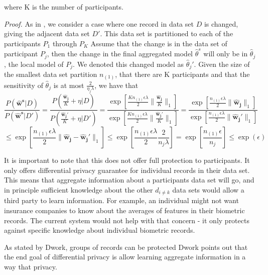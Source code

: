 where K is the number of participants.

\textit{Proof.} As in \cite{pathak2010diffprivhomo}, we consider a case where one record in data set $D$ is changed, giving the adjacent data set $D'$. This data set is partitioned to each of the participants $P_1$ through $P_K$ Assume that the change is in the data set of participant $P_j$, then the change in the final aggregated model $\hat{\theta}^s$ will only be in $\hat{\theta}_j$, the local model of $P_j$. We denoted this changed model as $\hat{\theta}_j'$. Given the size of the smallest data set partition $n_{(1)}$, that there are K participants and that the sensitivity of $\hat{\theta}_j$ is at most $\frac{2}{\eta_j\lambda}$, we have that
$$
\frac{P(\boldsymbol{\hat{w}^s}|D)}{P(\boldsymbol{\hat{w}^s}|D')} = \frac{P(\frac{\boldsymbol{\hat{w}_j}}{K} + \eta|D)}{P(\frac{\boldsymbol{\hat{w}_j'}}{K} + \eta|D')} = \frac{\exp[\frac{K n_{(1)}\epsilon\lambda}{2}\|\frac{\boldsymbol{\hat{w}_j}}{K}\|_1]}{\exp[\frac{K n_{(1)}\epsilon\lambda}{2}\|\frac{\boldsymbol{\hat{w}_j'}}{K}\|_1]}= \frac{\exp[\frac{n_{(1)}\epsilon\lambda}{2}\|\boldsymbol{\hat{w}_j}\|_1]}{\exp[\frac{n_{(1)}\epsilon\lambda}{2}\|\boldsymbol{\hat{w}_j'}\|_1]} $$
$$\leq \exp[\frac{n_{(1)}\epsilon\lambda}{2}\|\boldsymbol{\hat{w}_j} - \boldsymbol{\hat{w}_j'}\|_1]
\leq \exp[\frac{n_{(1)}\epsilon\lambda}{2}\frac{2}{n_j\lambda}]
= \exp[\frac{n_{(1)}\epsilon}{n_j}]
\leq \exp(\epsilon)
$$



It is important to note that this does not offer full protection to participants. It only offers differential privacy guarantee for individual records in their data set. This means that aggregate information about a participants data set will go, and in principle sufficient knowledge about the other $d_{i \neq k}$ data sets would allow a third party to learn information. For example, an individual might not want insurance companies to know about the averages of features in their biometric records. The current system would not help with that concern - it only protects against specific knowledge about 
individual biometric records. 

As stated by Dwork, groups of records can be protected  \cite{Dwork06differentialprivacy} Dwork points out that the end goal of differential privacy is allow learning aggregate information in a way that privacy. 

